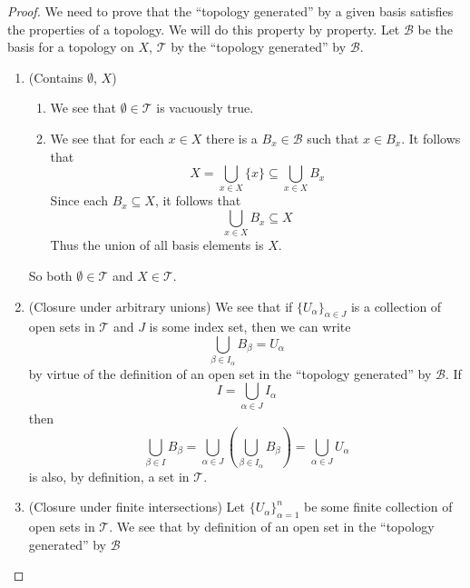 \begin{proof}
We need to prove that the ``topology generated'' by a given basis
satisfies the properties of a topology. We will do this property
by property. Let $\mathscr{B}$ be the basis for a topology on $X$,
$\mathcal{T}$ by the ``topology generated'' by $\mathscr{B}$.
\begin{enumerate}
\item (Contains $\emptyset$, $X$) \begin{enumerate}
\item We see that $\emptyset\in\mathcal{T}$ is vacuously true.
\item We see that for each $x\in X$ there is a $B_{x}\in\mathscr{B}$
  such that $x\in B_{x}$. It follows that
\begin{equation}%
 X=\bigcup_{x\in X}\{x\} \subseteq \bigcup_{x\in X}B_{x} 
\end{equation}
Since each $B_{x}\subseteq X$, it follows that 
\begin{equation}%
  \bigcup_{x\in X}B_{x}\subseteq X
\end{equation}
Thus the union of all basis elements is $X$.
\end{enumerate}
So both $\emptyset\in\mathcal{T}$ and $X\in\mathcal{T}$.
\item (Closure under arbitrary unions) We see that if
  $\{U_{\alpha}\}_{\alpha\in J}$ is a collection of open sets in
  $\mathcal{T}$ and $J$ is some index set, then we can write
\begin{equation}%
  \bigcup_{\beta\in I_{\alpha}} B_{\beta} = U_{\alpha}
\end{equation}
by virtue of the definition of an open set in the ``topology
generated'' by $\mathscr{B}$. If 
\begin{equation}
I = \bigcup_{\alpha\in J}I_{\alpha}
\end{equation}
then
\begin{equation}%
  \bigcup_{\beta\in I}B_{\beta} = \bigcup_{\alpha\in
    J}\left(\bigcup_{\beta\in I_{\alpha}} B_{\beta}\right) =
  \bigcup_{\alpha\in J}U_{\alpha}
\end{equation}
is also, by definition, a set in $\mathcal{T}$.
\item (Closure under finite intersections) Let
  $\{U_{\alpha}\}^{n}_{\alpha=1}$ be some finite collection of
  open sets in $\mathcal{T}$. We see that by definition of an
  open set in the ``topology generated'' by $\mathscr{B}$
\begin{equation}%

\end{equation}
\end{enumerate}
\end{proof}
